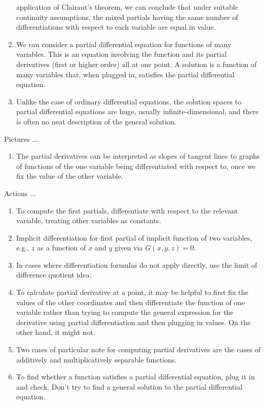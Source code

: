 \documentclass[10pt]{amsart}
\begin{document}
\begin{enumerate}
  application of Clairaut's theorem, we can conclude that under
  suitable continuity assumptions, the mixed partials having the same
  number of differentiations with respect to each variable are equal
  in value.
\item We can consider a partial differential equation for functions of
  many variables. This is an equation involving the function and its
  partial derivatives (first or higher order) all at one point. A
  solution is a function of many variables that, when plugged in,
  satisfies the partial differential equation.
\item Unlike the case of ordinary differential equations, the solution
  spaces to partial differential equations are huge, usually
  infinite-dimensional, and there is often no neat description of the
  general solution.
\end{enumerate}

Pictures ...

\begin{enumerate}
\item The partial derivatives can be interpreted as slopes of tangent
  lines to graphs of functions of the one variable being
  differentiated with respect to, once we fix the value of the other
  variable.
\end{enumerate}

Actions ...

\begin{enumerate}
\item To compute the first partials, differentiate with respect to the
  relevant variable, treating other variables as constants.
\item Implicit differentiation for first partial of implicit function
  of two variables, e.g., $z$ as a function of $x$ and $y$ given via
  $G(x,y,z) = 0$.
\item In cases where differentiation formulas do not apply directly,
  use the limit of difference quotient idea.
\item To calculate partial derivative at a point, it may be helpful to
  first fix the values of the other coordinates and then differentiate
  the function of one variable rather than trying to compute the
  general expression for the derivative using partial differentiation
  and then plugging in values. On the other hand, it might not.
\item Two cases of particular note for computing partial derivatives
  are the cases of additively and multiplicatively separable functions.
\item To find whether a function satisfies a partial differential
  equation, plug it in and check. Don't try to find a general solution
  to the partial differential equation.
\end{enumerate}
\end{document}
